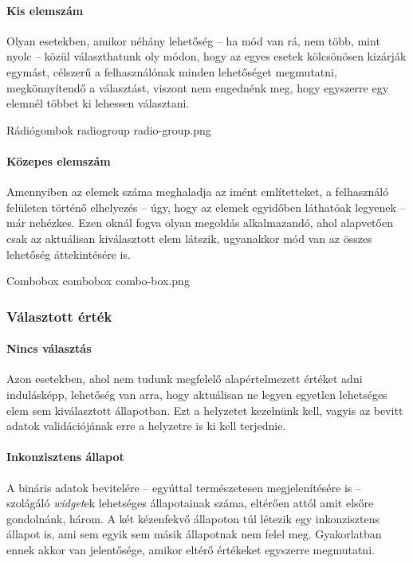 \paragraph{Kis elemszám}

Olyan esetekben, amikor néhány lehetőség -- ha mód van rá, nem több, mint nyolc -- közül választhatunk oly módon, hogy az egyes esetek kölcsönösen kizárják egymást, célszerű a felhasználónak minden lehetőséget megmutatni, megkönnyítendő a választást, viszont nem engednénk meg, hogy egyszerre egy elemnél többet ki lehessen választani.

{Rádiógombok}
{radiogroup}
{radio-group.png}

\paragraph{Közepes elemszám}

Amennyiben az elemek száma meghaladja az imént említetteket, a felhasználó felületen történő elhelyezés -- úgy, hogy az elemek egyidőben láthatóak legyenek -- már nehézkes. Ezen oknál fogva olyan megoldás alkalmazandó, ahol alapvetően csak az aktuálisan kiválasztott elem látszik, ugyanakkor mód van az összes lehetőség áttekintésére is.

{Combobox}
{combobox}
{combo-box.png}

\subsubsection{Választott érték}

\paragraph{Nincs választás}

Azon esetekben, ahol nem tudunk megfelelő alapértelmezett értéket adni indulásképp, lehetőség van arra, hogy aktuálisan ne legyen egyetlen lehetséges elem sem kiválasztott állapotban. Ezt a helyzetet kezelnünk kell, vagyis az bevitt adatok validációjának erre a helyzetre is ki kell terjednie.

\paragraph{Inkonzisztens állapot}
\label{sec:toggleinconsistent}

A bináris adatok bevitelére -- egyúttal természetesen megjelenítésére is -- szolágáló \textit{widget}ek lehetséges állapotainak száma, eltérően attól amit elsőre gondolnánk, három. A két kézenfekvő állapoton túl létezik egy inkonzisztens állapot is, ami sem egyik sem másik állapotnak nem felel meg. Gyakorlatban ennek akkor van jelentősége, amikor eltérő értékeket egyszerre megmutatni.

